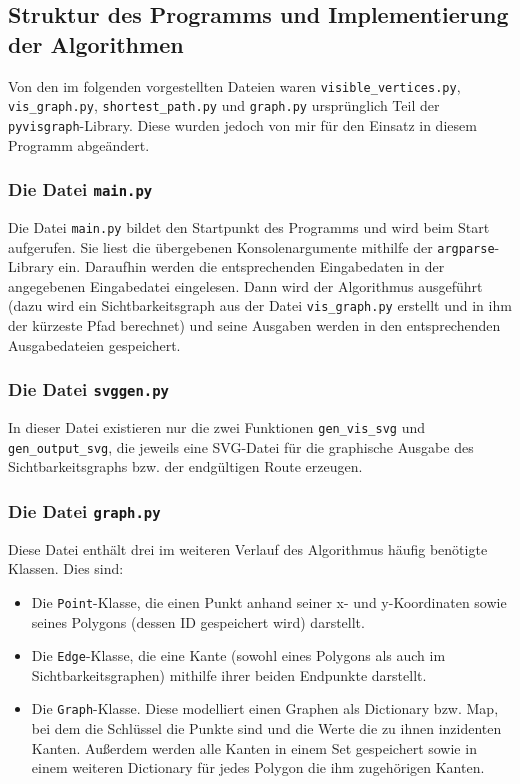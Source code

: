 \documentclass[a4paper, notitlepage, 12pt]{scrartcl}
\begin{document}
\subsection{Struktur des Programms und Implementierung der Algorithmen}
Von den im folgenden vorgestellten Dateien waren \texttt{visible\_vertices.py}, \texttt{vis\_graph.py}, \texttt{shortest\_path.py} und \texttt{graph.py} ursprünglich Teil der \texttt{pyvisgraph}-Library. Diese wurden jedoch von mir für den Einsatz in diesem Programm abgeändert.
\subsubsection{Die Datei \texttt{main.py}}
Die Datei \texttt{main.py} bildet den Startpunkt des Programms und wird beim Start aufgerufen. Sie liest die übergebenen Konsolenargumente mithilfe der \texttt{argparse}-Library ein. Daraufhin werden die entsprechenden Eingabedaten in der angegebenen Eingabedatei eingelesen. Dann wird der Algorithmus ausgeführt (dazu wird ein Sichtbarkeitsgraph aus der Datei \texttt{vis\_graph.py} erstellt und in ihm der kürzeste Pfad berechnet) und seine Ausgaben werden in den entsprechenden Ausgabedateien gespeichert.
\subsubsection{Die Datei \texttt{svggen.py}}
In dieser Datei existieren nur die zwei Funktionen \texttt{gen\_vis\_svg} und \texttt{gen\_output\_svg}, die jeweils eine SVG-Datei für die graphische Ausgabe des Sichtbarkeitsgraphs bzw. der endgültigen Route erzeugen.
\subsubsection{Die Datei \texttt{graph.py}}
Diese Datei enthält drei im weiteren Verlauf des Algorithmus häufig benötigte Klassen. Dies sind:
\begin{itemize}
	\item Die \texttt{Point}-Klasse, die einen Punkt anhand seiner x- und y-Koordinaten sowie seines Polygons (dessen ID gespeichert wird) darstellt.
	\item Die \texttt{Edge}-Klasse, die eine Kante (sowohl eines Polygons als auch im Sichtbarkeitsgraphen) mithilfe ihrer beiden Endpunkte darstellt.
	\item Die \texttt{Graph}-Klasse. Diese modelliert einen Graphen als Dictionary bzw. Map, bei dem die Schlüssel die Punkte sind und die Werte die zu ihnen inzidenten Kanten. Außerdem werden alle Kanten in einem Set gespeichert sowie in einem weiteren Dictionary für jedes Polygon die ihm zugehörigen Kanten.
\end{itemize}
\end{document}
